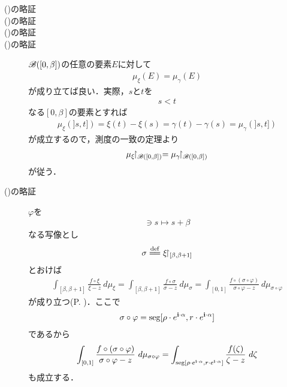 	\begin{description}
		\item[()の略証]
		\item[()の略証]
		\item[()の略証]
		\item[()の略証]
			$\mathscr{B}([0,\beta])$の任意の要素$E$に対して
			\begin{align}
				\mu_{\xi}(E) = \mu_{\gamma}(E)
			\end{align}
			が成り立てば良い．実際，$s$と$t$を
			\begin{align}
				s < t
			\end{align}
			なる$[0,\beta]$の要素とすれば
			\begin{align}
				\mu_{\xi}(]s,t]) = \xi(t) - \xi(s) = \gamma(t) - \gamma(s) = \mu_{\gamma}(]s,t])
			\end{align}
			が成立するので，測度の一致の定理より
			\begin{align}
				\mu_{\xi}\hspace{-0.41em}\upharpoonright_{\mathscr{B}([0,\beta])} = \mu_{\gamma}\hspace{-0.41em}\upharpoonright_{\mathscr{B}([0,\beta])}
			\end{align}
			が従う．
			
		\item[()の略証]
			$\varphi$を
			\begin{align}
				[0,1] \ni s \longmapsto s + \beta
			\end{align}
			なる写像とし
			\begin{align}
				\sigma \defeq \xi \rest_{[\beta,\beta+1]}
			\end{align}
			とおけば
			\begin{align}
				\int_{[\beta,\beta+1]} \frac{f \circ \xi}{\xi - z}\ d\mu_{\xi}
				= \int_{[\beta,\beta+1]} \frac{f \circ \sigma}{\sigma - z}\ d\mu_{\sigma}
				= \int_{[0,1]} \frac{f \circ (\sigma \circ \varphi)}{\sigma \circ \varphi - z}\ d\mu_{\sigma \circ \varphi}
			\end{align}
			が成り立つ(P. \pageref{fom:change_of_parameter_interval_complex_contour_integral})．ここで
			\begin{align}
				\sigma \circ \varphi = \operatorname{seg}[\rho \cdot e^{\mathbf{i} \cdot \alpha},r \cdot e^{\mathbf{i} \cdot \alpha}]
			\end{align}
			であるから
			\begin{align}
				\int_{[0,1]} \frac{f \circ (\sigma \circ \varphi)}{\sigma \circ \varphi - z}\ d\mu_{\sigma \circ \varphi}
				= \int_{\operatorname{seg}[\rho \cdot e^{\mathbf{i} \cdot \alpha},r \cdot e^{\mathbf{i} \cdot \alpha}]} \frac{f(\zeta)}{\zeta - z}\ d\zeta
			\end{align}
			も成立する．
			

\end{description}
